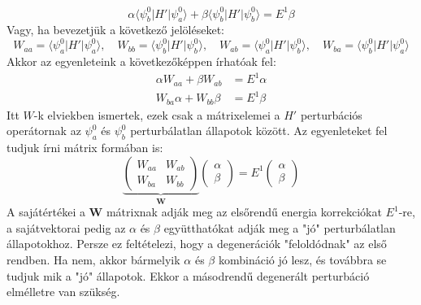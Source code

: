 \documentclass[../main.tex]{subfiles}
\begin{document}
\begin{equation}
    \alpha \langle \psi_b^0 | H' | \psi_a^0 \rangle + \beta \langle \psi_b^0 | H' | \psi_b^0 \rangle = E^1 \beta
\end{equation}
Vagy, ha bevezetjük a következő jelöléseket:
\begin{equation}
    W_{aa} = \langle \psi_a^0 | H' | \psi_a^0 \rangle, \quad W_{bb} = \langle \psi_b^0 | H' | \psi_b^0 \rangle, \quad W_{ab} = \langle \psi_a^0 | H' | \psi_b^0 \rangle, \quad W_{ba} = \langle \psi_b^0 | H' | \psi_a^0 \rangle
\end{equation}
Akkor az egyenleteink a következőképpen írhatóak fel:
\begin{equation}
    \begin{aligned}
         \alpha W_{aa} + \beta W_{ab} &= E^1 \alpha \\
        W_{ba} \alpha + W_{bb} \beta &= E^1 \beta
    \end{aligned}
\end{equation}
Itt $W$-k elviekben ismertek, ezek csak a mátrixelemei a $H'$ perturbációs operátornak az $\psi_a^0$ és $\psi_b^0$ perturbálatlan állapotok között.
Az egyenleteket fel tudjuk írni mátrix formában is:
\begin{equation}
    \underbrace{
    \begin{pmatrix}
        W_{aa} & W_{ab} \\
        W_{ba} & W_{bb}
    \end{pmatrix}}_{\mathbf{W}}
    \begin{pmatrix}
        \alpha \\
        \beta
    \end{pmatrix} = E^1
    \begin{pmatrix}
        \alpha \\
        \beta
    \end{pmatrix}
\end{equation}
A sajátértékei a $\mathbf{W}$ mátrixnak adják meg az elsőrendű energia korrekciókat $E^1$-re, a sajátvektorai pedig az $\alpha$ és $\beta$ együtthatókat adják meg a "jó" perturbálatlan állapotokhoz. Persze ez feltételezi,
hogy a degenerációk "feloldódnak" az első rendben. Ha nem, akkor bármelyik $\alpha$ és $\beta$ kombináció jó lesz, és továbbra se tudjuk mik a "jó" állapotok. Ekkor a másodrendű degenerált perturbáció elmélletre van szükség.
\end{document}
